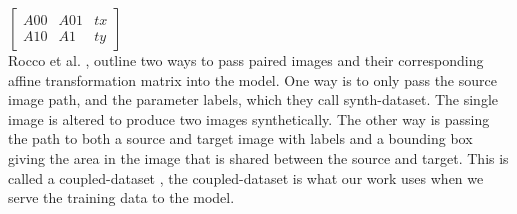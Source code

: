 $\begin{bmatrix}
A00& A01& tx \\
A10& A1& ty
\end{bmatrix}$\\
Rocco et al. \cite{Rocco18}, outline two ways to pass paired images and their corresponding affine transformation matrix into the model. One way is to only pass the source image path, and the parameter labels, which they call synth-dataset\cite{cnngeometric_pytorch}. The single image is altered to produce two images synthetically. The other way is passing the path to both a source and target image with labels and a bounding box giving the area in the image that is shared between the source and target. This is called a coupled-dataset \cite{cnngeometric_pytorch}, the coupled-dataset is what our work uses when we serve the training data to the model. 

